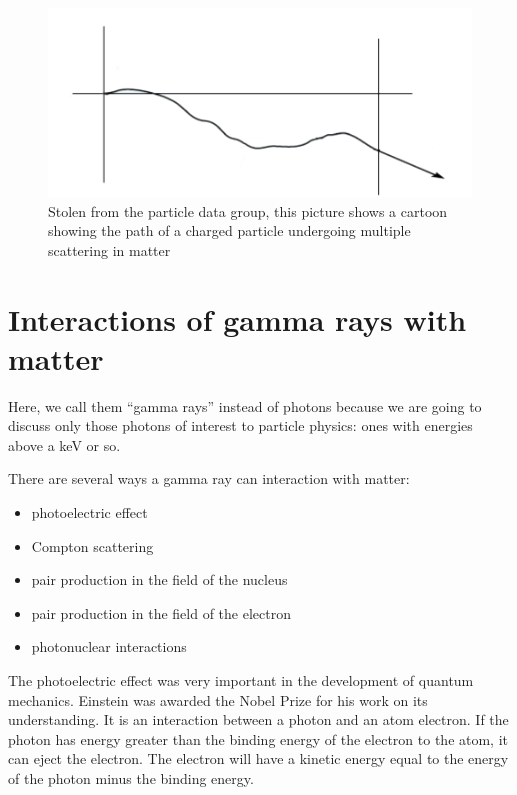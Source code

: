 \begin{figure}[h]
\centering\includegraphics[scale=0.5]{./particleinteractions/Pictures/multscattcartoon.pdf}
\caption{Stolen from the particle data group, this picture shows a cartoon showing the path of a charged particle undergoing multiple scattering in matter }
\label{fig:pdgmultscattcartoon}
\end{figure}



\section{Interactions of gamma rays with matter}

Here, we call them “gamma rays” instead of photons because we are going to discuss only those photons of interest to particle physics: ones with energies above a keV or so.

There are several ways a gamma ray can interaction with matter:
\begin{itemize}
\item photoelectric effect
\item Compton scattering
\item pair production in the field of the nucleus
\item pair production in the field of the electron
\item photonuclear interactions
\end{itemize}

The photoelectric effect was very important in the development of quantum mechanics.  Einstein was awarded the Nobel Prize for his work on its understanding.  It is an interaction between a photon and an atom electron.  If the photon has energy greater than the binding energy of the electron to the atom, it can eject the electron.  The electron will have a kinetic energy equal to the energy of the photon minus the binding energy.


